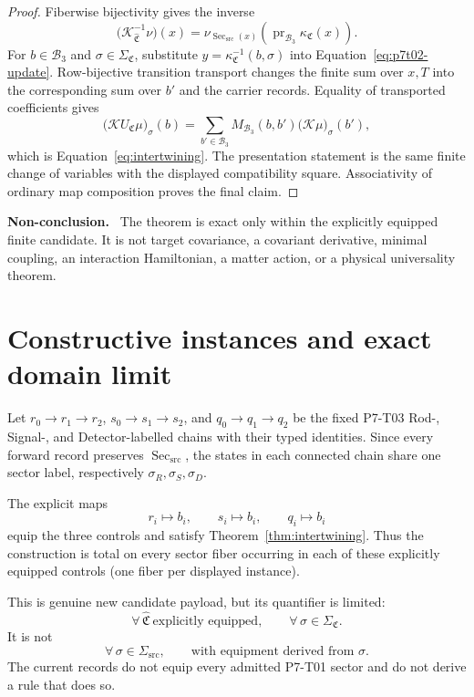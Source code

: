 \documentclass[11pt]{article}
\newenvironment{nonconclusion}{\par\smallskip\noindent\textbf{Non-conclusion.}\ }{\par\smallskip}
\newcommand{\Sec}{\operatorname{Sec}_{\mathrm{src}}}
\newcommand{\Control}{\mathfrak C}
\newcommand{\Carrier}{\mathcal B_3}
\newcommand{\Kmap}{\mathcal K}
\newcommand{\Update}{U}
\begin{document}
\begin{proof}
Fiberwise bijectivity gives the inverse
\[
 \bigl(\Kmap_{\widehat{\Control}}^{-1}\nu\bigr)(x)
 =
 \nu_{\Sec(x)}
 \!\left(\operatorname{pr}_{\Carrier}\kappa_{\Control}(x)\right).
\]
For \(b\in\Carrier\) and \(\sigma\in\Sigma_{\Control}\), substitute
\(y=\kappa_{\Control}^{-1}(b,\sigma)\) into
Equation~\eqref{eq:p7t02-update}.  Row-bijective transition transport
changes the finite sum over \(x,T\) into the corresponding sum over
\(b'\) and the carrier records.  Equality of transported coefficients gives
\[
 \bigl(\Kmap\Update_{\Control}\mu\bigr)_\sigma(b)
 =
 \sum_{b'\in\Carrier}
 M_{\Carrier}(b,b')
 \bigl(\Kmap\mu\bigr)_\sigma(b'),
\]
which is Equation~\eqref{eq:intertwining}.  The presentation statement is
the same finite change of variables with the displayed compatibility
square.  Associativity of ordinary map composition proves the final claim.
\end{proof}

\begin{nonconclusion}
The theorem is exact only within the explicitly equipped finite candidate.
It is not target covariance, a covariant derivative, minimal coupling, an
interaction Hamiltonian, a matter action, or a physical universality
theorem.
\end{nonconclusion}

\section{Constructive instances and exact domain limit}

Let \(r_0\to r_1\to r_2\),
\(s_0\to s_1\to s_2\), and
\(q_0\to q_1\to q_2\) be the fixed P7-T03 Rod-, Signal-, and
Detector-labelled chains with their typed identities.  Since every forward
record preserves \(\Sec\), the states in each connected chain share one
sector label, respectively \(\sigma_R,\sigma_S,\sigma_D\).

The explicit maps
\[
 r_i\mapsto b_i,\qquad s_i\mapsto b_i,\qquad q_i\mapsto b_i
\]
equip the three controls and satisfy
Theorem~\ref{thm:intertwining}.  Thus the construction is total on every
sector fiber occurring in each of these explicitly equipped controls
(one fiber per displayed instance).

This is genuine new candidate payload, but its quantifier is limited:
\[
 \forall\,\widehat{\Control}\ \text{explicitly equipped},\qquad
 \forall\,\sigma\in\Sigma_{\Control}.
\]
It is not
\[
 \forall\,\sigma\in\Sigma_{\mathrm{src}},\qquad
 \text{with equipment derived from }\sigma.
\]
The current records do not equip every admitted P7-T01 sector and do not
derive a rule that does so.
\end{document}

